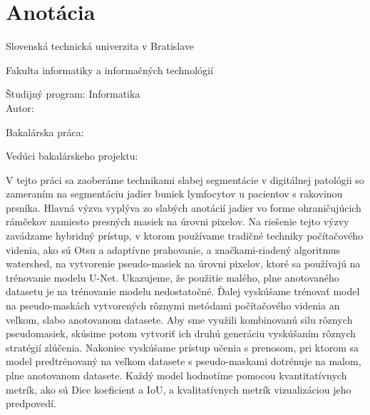 

\newpage{}\thispagestyle{empty}



\thispagestyle{empty}
\section*{Anotácia}

\begin{minipage}[t]{1\columnwidth}%
Slovenská technická univerzita v Bratislave

Fakulta informatiky a informačných technológií

Študijný program: Informatika\\

Autor: \myName

Bakalárska práca: \myTitle

Vedúci bakalárskeho projektu: \mySupervisor

\myDateSK%
\end{minipage}

\bigskip{}

V tejto práci sa zaoberáme technikami slabej segmentácie v digitálnej patológii so zameraním na segmentáciu jadier buniek lymfocytov u pacientov s rakovinou prsníka. Hlavná výzva vyplýva zo slabých anotácií jadier vo forme ohraničujúcich rámčekov namiesto presných masiek na úrovni pixelov. Na riešenie tejto výzvy zavádzame hybridný prístup, v ktorom používame tradičné techniky počítačového videnia, ako sú Otsu a adaptívne prahovanie, a značkami-riadený algoritmus watershed, na vytvorenie pseudo-masiek na úrovni pixelov, ktoré sa používajú na trénovanie modelu U-Net. Ukazujeme, že použitie malého, plne anotovaného datasetu je na trénovanie modelu nedostatočné. Ďalej vyskúšame trénovať model na pseudo-maskách vytvorených rôznymi metódami počítačového videnia an veľkom, slabo anotovanom datasete. Aby sme využili kombinovanú silu rôznych pseudomasiek, skúsime potom vytvoriť ich druhú generáciu vyskúšaním rôznych stratégií zlúčenia. Nakoniec vyskúšame prístup učenia s prenosom, pri ktorom sa model predtrénovaný na veľkom datasete s pseudo-maskami dotrénuje na malom, plne anotovanom datasete. Každý model hodnotíme pomocou kvantitatívnych metrík, ako sú Dice koeficient a IoU, a kvalitatívnych metrík vizualizáciou jeho predpovedí.



\newpage{}\thispagestyle{empty}\medskip{}


\newpage{}



\newpage

